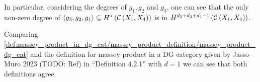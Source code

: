 \begin{remark}
    In particular, considering the degrees of \( g_1, g_2 \) and \( g_3 \), one can see that the only non-zero degree of \( \langle g_3, g_2, g_1  \rangle \subseteq H^* \left( {\mathcal{C}} \left( X_1, X_4 \right) \right) \) is in \( H^{d_3 + d_2 + d_1 - 1} \left( {\mathcal{C}} \left( X_1, X_4 \right) \right) \).
\end{remark}

\begin{remark}
    Comparing \autoref{def:massey_product_in_dg_cat/massey_product_definition/massey_product_dg_cat} and the definition for massey product in a DG category given by Jasso--Muro 2023 (TODO: Ref) in ``Definition 4.2.1'' with \( d = 1 \) we can see that both definitions agree.
\end{remark}

